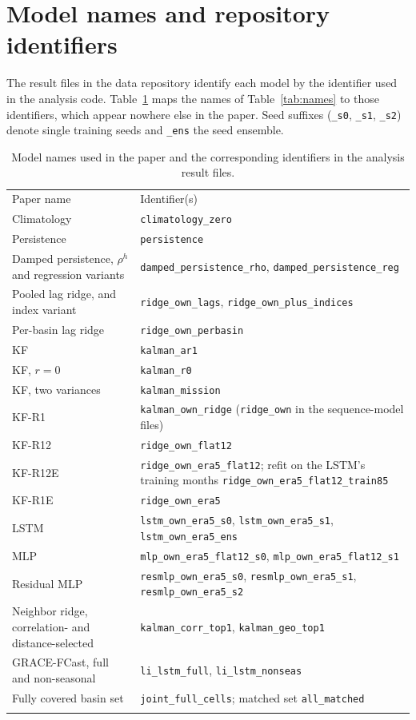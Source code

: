 \documentclass[hess, manuscript]{copernicus}
\begin{document}
\appendix

\section{Model names and repository identifiers}
\label{app:names}

The result files in the data repository identify each model by the
identifier used in the analysis code. Table~\ref{tab:codes} maps the names of
Table~\ref{tab:names} to those identifiers, which appear nowhere else in
the paper. Seed suffixes (\texttt{\_s0}, \texttt{\_s1}, \texttt{\_s2})
denote single training seeds and \texttt{\_ens} the seed ensemble.

\begin{table}[!htbp]
\caption{Model names used in the paper and the corresponding identifiers in
the analysis result files.}
\label{tab:codes}
\begin{tabular}{>{\raggedright\arraybackslash}p{5.4cm}>{\raggedright\arraybackslash}p{9.8cm}}
\tophline
Paper name & Identifier(s) \\
\middlehline
Climatology & \texttt{climatology\_zero} \\
Persistence & \texttt{persistence} \\
Damped persistence, $\rho^{h}$ and regression variants & \texttt{damped\_persistence\_rho}, \texttt{damped\_persistence\_reg} \\
Pooled lag ridge, and index variant & \texttt{ridge\_own\_lags}, \texttt{ridge\_own\_plus\_indices} \\
Per-basin lag ridge & \texttt{ridge\_own\_perbasin} \\
KF & \texttt{kalman\_ar1} \\
KF, $r = 0$ & \texttt{kalman\_r0} \\
KF, two variances & \texttt{kalman\_mission} \\
KF-R1 & \texttt{kalman\_own\_ridge} (\texttt{ridge\_own} in the sequence-model files) \\
KF-R12 & \texttt{ridge\_own\_flat12} \\
KF-R12E & \texttt{ridge\_own\_era5\_flat12}; refit on the LSTM's training months \texttt{ridge\_own\_era5\_flat12\_train85} \\
KF-R1E & \texttt{ridge\_own\_era5} \\
LSTM & \texttt{lstm\_own\_era5\_s0}, \texttt{lstm\_own\_era5\_s1}, \texttt{lstm\_own\_era5\_ens} \\
MLP & \texttt{mlp\_own\_era5\_flat12\_s0}, \texttt{mlp\_own\_era5\_flat12\_s1} \\
Residual MLP & \texttt{resmlp\_own\_era5\_s0}, \texttt{resmlp\_own\_era5\_s1}, \texttt{resmlp\_own\_era5\_s2} \\
Neighbor ridge, correlation- and distance-selected & \texttt{kalman\_corr\_top1}, \texttt{kalman\_geo\_top1} \\
GRACE-FCast, full and non-seasonal & \texttt{li\_lstm\_full}, \texttt{li\_lstm\_nonseas} \\
Fully covered basin set & \texttt{joint\_full\_cells}; matched set \texttt{all\_matched} \\
\bottomhline
\end{tabular}
\end{table}
\end{document}
